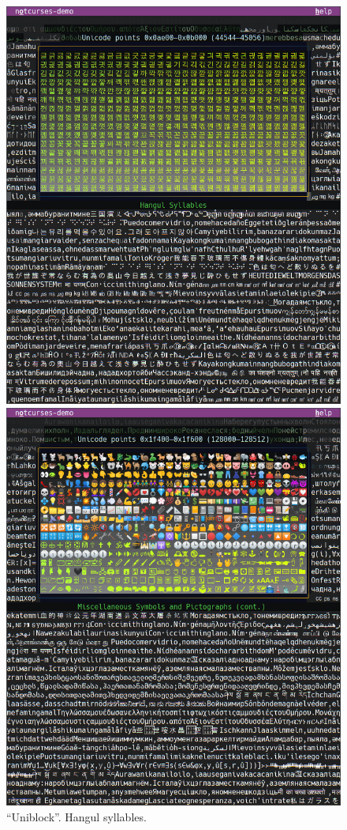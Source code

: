 \documentclass[letterpaper,10pt]{article}
\begin{document}
\begin{figure}
  \centering
  \begin{minipage}{0.45\textwidth}
    \includegraphics[width=1\linewidth]{media/demo-uniblock1.png}
    \caption{``Uniblock''. Hangul syllables.}
  \end{minipage}\hfill
  \begin{minipage}{0.45\textwidth}
    \includegraphics[width=1\linewidth]{media/demo-uniblock2.png}

\end{minipage}
\end{figure}
\end{document}
